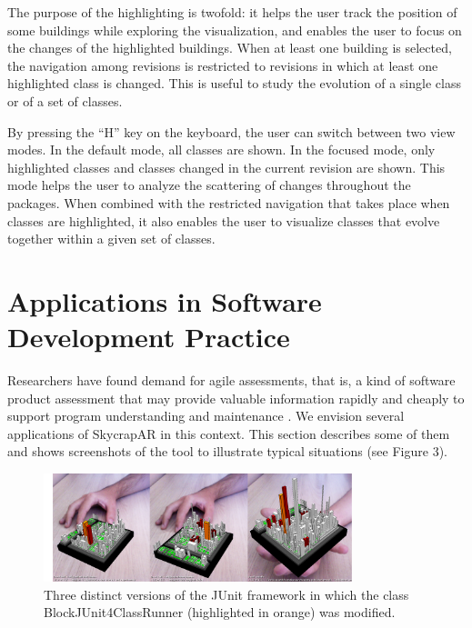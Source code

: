 The purpose of the highlighting is twofold: it helps the user track the position of some buildings while exploring the visualization, and enables the user to focus on the changes of the highlighted buildings. When at least one building is selected, the navigation among revisions is restricted to revisions in which at least one highlighted class is changed. This is useful to study the evolution of a single class or of a set of classes.

By pressing the ``H'' key on the keyboard, the user can switch between two view modes. In the default mode, all classes are shown. In the focused mode, only highlighted classes and classes changed in the current revision are shown. This mode helps the user to analyze the scattering of changes throughout the packages. When combined with the restricted navigation that takes place when classes are highlighted, it also enables the user to visualize classes that evolve together within a given set of classes.

\section{Applications in Software Development Practice} \label{sec:applications}

Researchers have found demand for agile assessments, that is, a kind of software product assessment that may provide valuable information rapidly and cheaply to support program understanding and maintenance \cite{nierstrasz:2012}. We envision several applications of SkycrapAR in this context. This section describes some of them and shows screenshots of the tool to illustrate typical situations (see Figure 3).

\begin{figure}[t]
 \centering
 \includegraphics[width=0.8\textwidth, bb=14 14 2114 755]{./images/applications}
 \caption{Three distinct versions of the JUnit framework in which the class BlockJUnit4ClassRunner (highlighted in orange) was modified.}
 \label{fig:TOBEDEFINED}
\end{figure}


